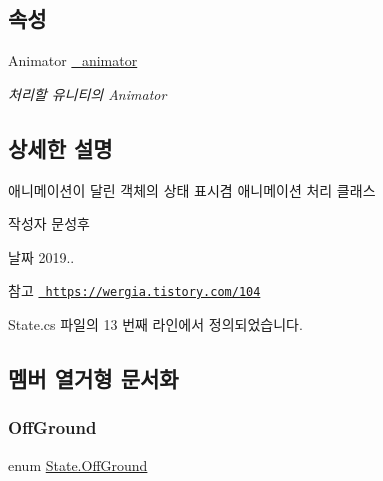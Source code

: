\subsection*{속성}
\begin{DoxyCompactItemize}
\item 
Animator \mbox{\hyperlink{class_state_aff1dd03a1b3c63053b23371d6d70cd1a}{\+\_\+animator}}
\begin{DoxyCompactList}\small\item\em 처리할 유니티의 Animator \end{DoxyCompactList}\end{DoxyCompactItemize}


\subsection{상세한 설명}
애니메이션이 달린 객체의 상태 표시겸 애니메이션 처리 클래스 

\begin{DoxyAuthor}{작성자}
문성후 
\end{DoxyAuthor}
\begin{DoxyDate}{날짜}
2019.. 
\end{DoxyDate}
\begin{DoxySeeAlso}{참고}
\href{https://wergia.tistory.com/104}{\texttt{ https\+://wergia.\+tistory.\+com/104}} 
\end{DoxySeeAlso}


State.\+cs 파일의 13 번째 라인에서 정의되었습니다.



\subsection{멤버 열거형 문서화}
\mbox{\label{class_state_a7d945e793324c017a973205564cf1a56}} 
\subsubsection{\texorpdfstring{OffGround}{OffGround}}
{\footnotesize\ttfamily enum \mbox{\hyperlink{class_state_a7d945e793324c017a973205564cf1a56}{State.\+Off\+Ground}}\hspace{0.3cm}{\ttfamily [strong]}}

